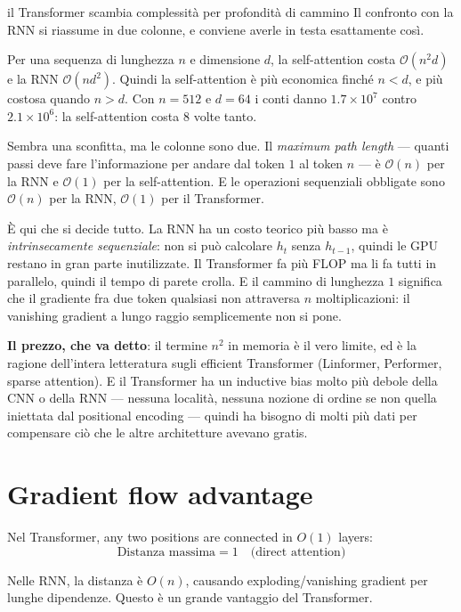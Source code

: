 \begin{intuizione}{il Transformer scambia complessità per profondità di cammino}
Il confronto con la RNN si riassume in due colonne, e conviene averle in testa esattamente così.

Per una sequenza di lunghezza $n$ e dimensione $d$, la self-attention costa $\mathcal{O}(n^2 d)$ e la RNN $\mathcal{O}(n d^2)$. Quindi la self-attention è più economica finché $n < d$, e più costosa quando $n > d$. Con $n = 512$ e $d = 64$ i conti danno $1.7 \times 10^7$ contro $2.1 \times 10^6$: la self-attention costa $8$ volte tanto.

Sembra una sconfitta, ma le colonne sono due. Il \emph{maximum path length} — quanti passi deve fare l'informazione per andare dal token $1$ al token $n$ — è $\mathcal{O}(n)$ per la RNN e $\mathcal{O}(1)$ per la self-attention. E le operazioni sequenziali obbligate sono $\mathcal{O}(n)$ per la RNN, $\mathcal{O}(1)$ per il Transformer.

È qui che si decide tutto. La RNN ha un costo teorico più basso ma è \emph{intrinsecamente sequenziale}: non si può calcolare $h_t$ senza $h_{t-1}$, quindi le GPU restano in gran parte inutilizzate. Il Transformer fa più FLOP ma li fa tutti in parallelo, quindi il tempo di parete crolla. E il cammino di lunghezza $1$ significa che il gradiente fra due token qualsiasi non attraversa $n$ moltiplicazioni: il vanishing gradient a lungo raggio semplicemente non si pone.

\textbf{Il prezzo, che va detto}: il termine $n^2$ in memoria è il vero limite, ed è la ragione dell'intera letteratura sugli efficient Transformer (Linformer, Performer, sparse attention). E il Transformer ha un inductive bias molto più debole della CNN o della RNN — nessuna località, nessuna nozione di ordine se non quella iniettata dal positional encoding — quindi ha bisogno di molti più dati per compensare ciò che le altre architetture avevano gratis.
\end{intuizione}

\section{Gradient flow advantage}

Nel Transformer, any two positions are connected in $O(1)$ layers:
\[
\text{Distanza massima} = 1 \quad \text{(direct attention)}
\]

Nelle RNN, la distanza è $O(n)$, causando exploding/vanishing gradient per lunghe dipendenze. Questo è un grande vantaggio del Transformer.

